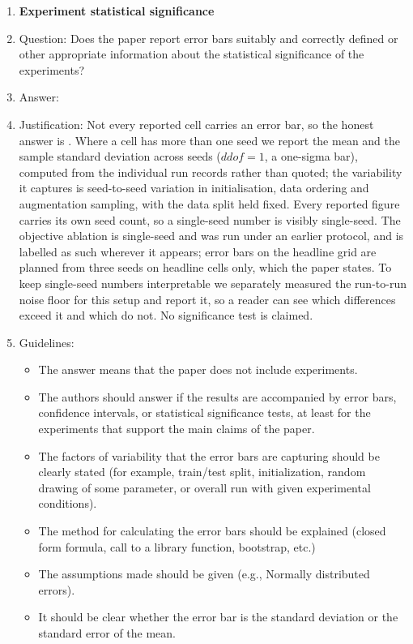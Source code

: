 \begin{enumerate}
\item {\bf Experiment statistical significance}
    \item[] Question: Does the paper report error bars suitably and correctly defined or other appropriate information about the statistical significance of the experiments?
    \item[] Answer: \answerNo{}
    \item[] Justification: Not every reported cell carries an error bar, so the honest answer is \answerNo{}. Where a cell has more than one seed we report the mean and the sample standard deviation across seeds ($ddof = 1$, a one-sigma bar), computed from the individual run records rather than quoted; the variability it captures is seed-to-seed variation in initialisation, data ordering and augmentation sampling, with the data split held fixed. Every reported figure carries its own seed count, so a single-seed number is visibly single-seed. The objective ablation is single-seed and was run under an earlier protocol, and is labelled as such wherever it appears; error bars on the headline grid are planned from three seeds on headline cells only, which the paper states. To keep single-seed numbers interpretable we separately measured the run-to-run noise floor for this setup and report it, so a reader can see which differences exceed it and which do not. No significance test is claimed.
    \item[] Guidelines:
    \begin{itemize}
        \item The answer \answerNA{} means that the paper does not include experiments.
        \item The authors should answer \answerYes{} if the results are accompanied by error bars, confidence intervals, or statistical significance tests, at least for the experiments that support the main claims of the paper.
        \item The factors of variability that the error bars are capturing should be clearly stated (for example, train/test split, initialization, random drawing of some parameter, or overall run with given experimental conditions).
        \item The method for calculating the error bars should be explained (closed form formula, call to a library function, bootstrap, etc.)
        \item The assumptions made should be given (e.g., Normally distributed errors).
        \item It should be clear whether the error bar is the standard deviation or the standard error of the mean.

\end{itemize}
\end{enumerate}
